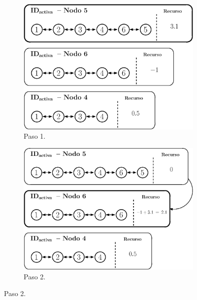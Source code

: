 \begin{figure}[H]
    \centering
    
    \begin{subfigure}{0.55\textwidth}
        \centering
        \includegraphics[width=\linewidth]{fig/05_den2ne/den2ne_11.eps}
        \caption{Paso 1.}
        \label{fig:den2ne_11}
    \end{subfigure}
    
    \vspace{0.3cm}
    
    \begin{subfigure}{0.55\textwidth}
        \centering
        \includegraphics[width=\linewidth]{fig/05_den2ne/den2ne_12.eps}
        \caption{Paso 2.}
        \label{fig:den2ne_12}
    \end{subfigure}
    

\end{figure}
